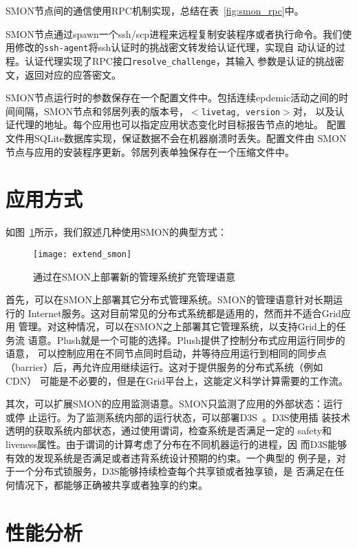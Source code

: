 SMON节点间的通信使用RPC机制实现，总结在表~\ref{fig:smon_rpc}中。

SMON节点通过spawn一个ssh/scp进程来远程复制安装程序或者执行命令。我们使
用修改的\texttt{ssh-agent}将ssh认证时的挑战密文转发给认证代理，实现自
动认证的过程。认证代理实现了RPC接口\texttt{resolve\_challenge}，其输入
参数是认证的挑战密文，返回对应的应答密文。

SMON节点运行时的参数保存在一个配置文件中。包括连续epdemic活动之间的时
间间隔，SMON节点和邻居列表的版本号，$<$\texttt{livetag, version}$>$对，
以及认证代理的地址。每个应用也可以指定应用状态变化时目标报告节点的地址。
配置文件用SQLite数据库实现，保证数据不会在机器崩溃时丢失。配置文件由
SMON节点与应用的安装程序更新。邻居列表单独保存在一个压缩文件中。


\section{应用方式}
\label{sec:smon_app}

如图~\ref{fig:extend_smon}所示，我们叙述几种使用SMON的典型方式：

\begin{figure}
\centering
\begin{minipage}{0.8\linewidth}
\centering
\texttt{[image: extend\_smon]}
\caption{通过在SMON上部署新的管理系统扩充管理语意}
\label{fig:extend_smon}
\end{minipage}
\end{figure}

首先，可以在SMON上部署其它分布式管理系统。SMON的管理语意针对长期运行的
Internet服务。这对目前常见的分布式系统都是适用的，然而并不适合Grid应用
管理。对这种情况，可以在SMON之上部署其它管理系统，以支持Grid上的任务流
语意。Plush就是一个可能的选择。Plush提供了控制分布式应用运行同步的语意，
可以控制应用在不同节点同时启动，并等待应用运行到相同的同步点
（barrier）后，再允许应用继续运行。这对于提供服务的分布式系统（例如CDN）
可能是不必要的，但是在Grid平台上，这能定义科学计算需要的工作流。

其次，可以扩展SMON的应用监测语意。SMON只监测了应用的外部状态：运行或停
止运行。为了监测系统内部的运行状态，可以部署D3S~\cite{d3s}。D3S使用插
装技术透明的获取系统内部状态，通过使用谓词，检查系统是否满足一定的
safety和liveness属性。由于谓词的计算考虑了分布在不同机器运行的进程，因
而D3S能够有效的发现系统是否满足或者违背系统设计预期的约束。一个典型的
例子是，对于一个分布式锁服务，D3S能够持续检查每个共享锁或者独享锁，是
否满足在任何情况下，都能够正确被共享或者独享的约束。

\section{性能分析}
\label{sec:smon_analysis}

